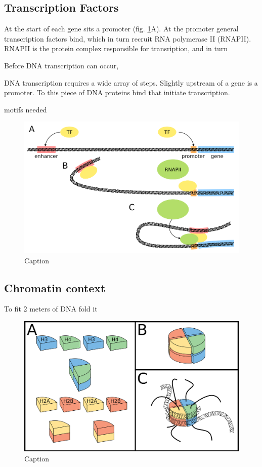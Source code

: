 \subsection{Transcription Factors}

At the start of each gene sits a promoter (fig. \ref{fig:TF}A). At the promoter general transcription factors bind, which in turn recruit RNA polymerase II (RNAPII). RNAPII is the protein complex responsible for transription, and in turn 

Before DNA transcription can occur, 

DNA transcription requires a wide array of steps. Slightly upstream of a gene is a promoter. To this piece of DNA proteins bind that initiate transcription.

motifs needed

\begin{figure}[H]
    \includegraphics[width=\linewidth]{ch.introduction/imgs/transcription_factor.png}
    \caption{Caption}
    \label{fig:TF}
\end{figure}

\subsection{Chromatin context}

To fit 2 meters of DNA fold it

\begin{figure}[H]
    \includegraphics[width=\linewidth]{ch.introduction/imgs/histones.png}
    \caption{Caption}
    \label{fig:histones}
\end{figure}

